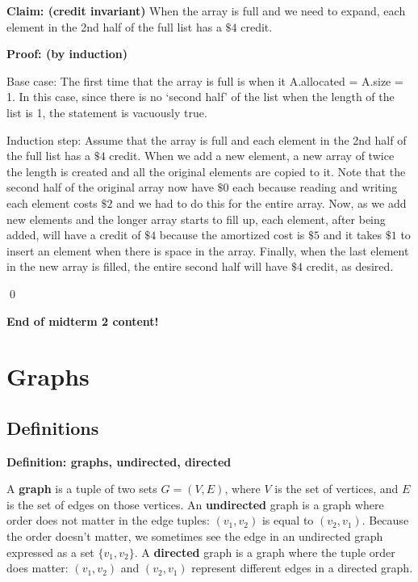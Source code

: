 \documentclass[11pt]{article}
\begin{document}
\textbf{Claim: (credit invariant)} When the array is full and we need to expand, each element in the 2nd half of the full list has a $\$ 4$ credit. 

\textbf{Proof: (by induction)}

Base case: The first time that the array is full is when it A.allocated = A.size = 1. In this case, since there is no `second half' of the list when the length of the list is 1, the statement is vacuously true. 

Induction step: Assume that the array is full and each element in the 2nd half of the full list has a $\$ 4$ credit. When we add a new element, a new array of twice the length is created and all the original elements are copied to it. Note that the second half of the original array now have $\$ 0$ each because reading and writing each element costs $\$ 2$ and we had to do this for the entire array. Now, as we add new elements and the longer array starts to fill up, each element, after being added, will have a credit of $\$ 4$ because the amortized cost is $\$ 5$ and it takes $\$ 1$ to insert an element when there is space in the array. Finally, when the last element in the new array is filled, the entire second half will have $\$ 4$ credit, as desired. 

\qed


\begin{center}
    \textbf{End of midterm 2 content!}
\end{center}

\newpage 
\section{Graphs}
\subsection{Definitions}
\textbf{Definition: graphs, undirected, directed} 

A \textbf{graph} is a tuple of two sets $G = (V, E)$, where $V$ is the set of vertices, and $E$ is the set of edges on those vertices. An \textbf{undirected} graph is a graph where order does not matter in the edge tuples: $(v_1,v_2)$ is equal to $(v_2,v_1)$. Because the order doesn't matter, we sometimes see the edge in an undirected graph expressed as a set $\{v_1, v_2\}$. A \textbf{directed} graph is a graph where the tuple order does matter: $(v_1,v_2)$ and $(v_2,v_1)$ represent different edges in a directed graph.
\end{document}

